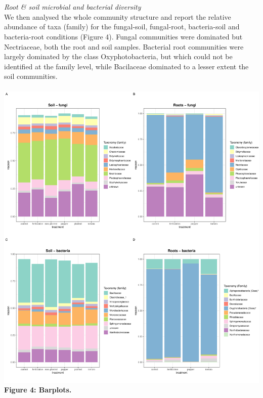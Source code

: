 \documentclass[11pt,]{article}
\begin{document}
~\\
\hspace*{0.333em}\\
\emph{Root \& soil microbial and bacterial diversity}\\
We then analysed the whole community structure and report the relative
abundance of taxa (family) for the fungal-soil, fungal-root,
bacteria-soil and bacteria-root conditions (Figure 4). Fungal
communities were dominated but Nectriaceae, both the root and soil
samples. Bacterial root communities were largely dominated by the class
Oxyphotobacteria, but which could not be identified at the family level,
while Bacilaceae dominated to a lesser extent the soil communities.\\
\hspace*{0.333em}\\
\includegraphics[width=7.29167in]{../figures/Figure4_barplots.pdf}\\
\textbf{Figure 4: Barplots.}\\
\hspace*{0.333em}\\
\hspace*{0.333em}\\
\end{document}

